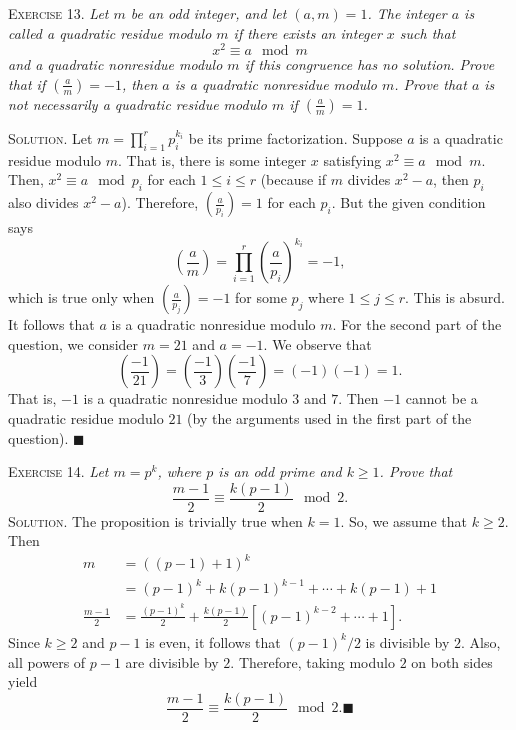 \documentclass[11pt, leqno]{article}
\newcommand{\done}{\ensuremath{\blacksquare}}
\begin{document}
\textsc{Exercise 13}. \emph{Let $m$ be an odd integer, and let $(a,m) = 1$. The integer $a$ is called a quadratic residue modulo $m$ if there exists an integer $x$ such that 
\begin{displaymath}
x^2 \equiv a \mod m
\end{displaymath}
and a quadratic nonresidue modulo $m$ if this congruence has no solution. Prove that if $\left( \frac{a}{m} \right) = -1$, then $a$ is a quadratic nonresidue modulo $m$. Prove that $a$ is not necessarily a quadratic residue modulo $m$ if $\left( \frac{a}{m} \right) = 1$.}

\textsc{Solution}. Let $m = \prod_{i=1}^r p_i^{k_i}$ be its prime factorization. Suppose $a$ is a quadratic residue modulo $m$. That is, there is some integer $x$ satisfying $x^2 \equiv a \mod m$. Then, $x^2 \equiv a \mod p_i$ for each $1 \leq i \leq r$ (because if $m$ divides $x^2-a$, then $p_i$ also divides $x^2-a$). Therefore, $\left( \frac{a}{p_i} \right) = 1$ for each $p_i$. But the given condition says
\begin{displaymath}
\left( \frac{a}{m} \right) = \prod_{i=1}^r \left( \frac{a}{p_i} \right)^{k_i} = -1,
\end{displaymath}
which is true only when $\left( \frac{a}{p_j} \right) = -1$ for some $p_j$ where $1\leq j \leq r$. This is absurd. It follows that $a$ is a quadratic nonresidue modulo $m$. For the second part of the question, we consider $m = 21$ and $a=-1$. We observe that 
\begin{displaymath}
\left( \frac{-1}{21} \right) = \left( \frac{-1}{3} \right) \left( \frac{-1}{7} \right) = (-1)(-1) = 1.
\end{displaymath}
That is, $-1$ is a quadratic nonresidue modulo $3$ and $7$. Then $-1$ cannot be a quadratic residue modulo $21$ (by the arguments used in the first part of the question). \done

\textsc{Exercise 14}. \emph{Let $m = p^k$, where $p$ is an odd prime and $k\geq 1$. Prove that 
\begin{displaymath}
\frac{m-1}{2} \equiv \frac{k(p-1)}{2} \mod 2.
\end{displaymath}}\textsc{Solution}. The proposition is trivially true when $k=1$. So, we assume that $k\geq 2$. Then
\begin{align*}
  m &= ((p-1)+1)^k \\
    &= (p-1)^k + k(p-1)^{k-1} + \cdots + k(p-1) + 1 \\
  \frac{m-1}{2} &= \frac{(p-1)^k}{2} + \frac{k(p-1)}{2}[(p-1)^{k-2} + \cdots + 1].
\end{align*} Since $k\geq 2$ and $p-1$ is even, it follows that $(p-1)^k/2$ is divisible by $2$. Also, all powers of $p-1$ are divisible by $2$. Therefore, taking modulo $2$ on both sides yield 
\begin{displaymath}
\frac{m-1}{2} \equiv \frac{k(p-1)}{2} \mod 2.\done
\end{displaymath}
\end{document}
